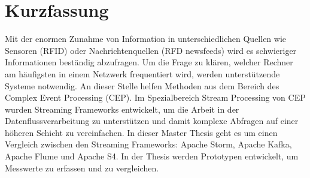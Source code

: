 

\section*{Kurzfassung}
Mit der enormen Zunahme von Information in unterschiedlichen Quellen wie Sensoren (RFID) oder 
Nachrichtenquellen (RFD newsfeeds) wird es schwieriger Informationen beständig abzufragen. Um die
Frage zu klären, welcher Rechner am häufigsten in einem Netzwerk frequentiert wird, werden unterstützende 
Systeme notwendig. An dieser Stelle helfen Methoden aus dem Bereich des Complex Event Processing (CEP).
Im Spezialbereich Stream Processing von CEP wurden Streaming Frameworks entwickelt, 
um die Arbeit in der Datenflussverarbeitung zu unterstützen und damit komplexe Abfragen auf einer höheren
Schicht zu vereinfachen. In dieser Master Thesis geht es um einen Vergleich zwischen den Streaming Frameworks:
Apache Storm, Apache Kafka, Apache Flume und Apache S4. In der Thesis werden Prototypen entwickelt, um
Messwerte zu erfassen und zu vergleichen.



